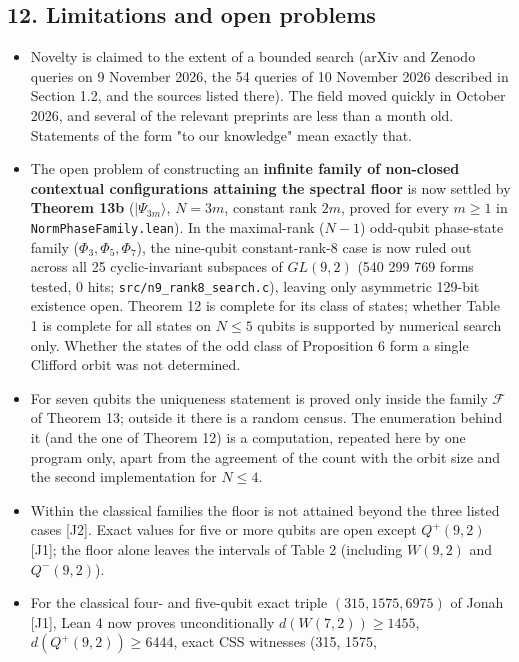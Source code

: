 \documentclass[11pt,a4paper]{article}
\providecommand{\tightlist}{\setlength{\itemsep}{0pt}\setlength{\parskip}{0pt}}
\begin{document}
\subsection{12. Limitations and open problems}\label{12-limitations-and-open-problems}

\begin{itemize}
\tightlist
\item
  Novelty is claimed to the extent of a bounded search (arXiv and Zenodo queries on 9 November 2026,
  the 54 queries of 10 November 2026 described in Section 1.2, and the sources listed there). The field
  moved quickly in October 2026, and several of the relevant preprints are less than a month old.
  Statements of the form "to our knowledge" mean exactly that.
\item
  The open problem of constructing an \textbf{infinite family of non-closed contextual configurations attaining
  the spectral floor} is now settled by \textbf{Theorem 13b} (\(|\Psi_{3m}\rangle\), \(N=3m\), constant rank \(2m\),
  proved for every \(m\ge1\) in \nolinkurl{NormPhaseFamily.lean}). In the maximal-rank (\(N-1\)) odd-qubit phase-state
  family (\(\Phi_3, \Phi_5, \Phi_7\)), the nine-qubit constant-rank-8 case is now ruled out across all 25
  cyclic-invariant subspaces of \(GL(9,2)\) (540 299 769 forms tested, 0 hits; \nolinkurl{src/n9_rank8_search.c}),
  leaving only asymmetric 129-bit existence open. Theorem 12 is complete for its class of states; whether
  Table 1 is complete for all states on \(N \le 5\) qubits is supported by numerical search only. Whether
  the states of the odd class of Proposition 6 form a single Clifford orbit was not determined.
\item
  For seven qubits the uniqueness statement is proved only inside the family \(\mathcal{F}\) of
  Theorem 13; outside it there is a random census. The enumeration behind it (and the one of
  Theorem 12) is a computation, repeated here by one program only, apart from the agreement of the
  count with the orbit size and the second implementation for \(N \le 4\).
\item
  Within the classical families the floor is not attained beyond the three listed cases {[}J2{]}. Exact
  values for five or more qubits are open except \(Q^+(9,2)\) {[}J1{]}; the floor alone leaves the intervals
  of Table 2 (including \(W(9,2)\) and \(Q^-(9,2)\)).
\item
  For the classical four- and five-qubit exact triple \((315, 1575, 6975)\) of Jonah {[}J1{]}, Lean 4 now
  proves unconditionally \(d(W(7,2)) \ge 1455\), \(d(Q^+(9,2)) \ge 6444\), exact CSS witnesses (315, 1575,

\end{itemize}
\end{document}
